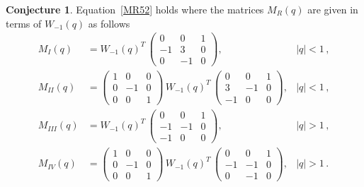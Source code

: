 \documentclass[12pt,reqno]{amsart}
\theoremstyle{definition}
\newtheorem{conjecture}[theorem]{Conjecture}
\begin{document}
\begin{conjecture}
  \label{conj.52M0}
  Equation~\eqref{MR52} holds where the matrices $M_R(q)$ are given in
  terms of $W_{-1}(q)$ as follows 
\begin{subequations}
\begin{align}
  \label{M52I}
  M_I(q)
  &= W_{-1}(q)^T \,
    \begin{pmatrix}
      0 & 0 & 1 \\
      -1 & 3 & 0 \\
      0 & -1 & 0
    \end{pmatrix}, & |q|<1 \,,  \\
  \label{M52II}
  M_{II}(q)
  &=\begin{pmatrix}
      1&0&0\\
      0&-1&0\\
      0&0&1
    \end{pmatrix} \,
           W_{-1}(q)^T \,
           \begin{pmatrix}
             0&0&1\\
             3&-1&0\\
             -1&0&0
           \end{pmatrix}, & |q|<1 \,, \\
  \label{M52III}
  M_{III}(q)
  &=
         W_{-1}(q)^T \,
         \begin{pmatrix}
           0&0&1\\
           -1&-1&0\\
           -1&0&0
         \end{pmatrix}, & |q| >1 \,, \\
  \label{M52IV}
  M_{IV}(q)
  &=\begin{pmatrix}
      1&0&0\\
      0&-1&0\\
      0&0&1
    \end{pmatrix} \,
    W_{-1}(q)^T \,
    \begin{pmatrix}
      0&0&1\\
      -1&-1&0\\
      0&-1&0
    \end{pmatrix}, & |q| >1 \,.
\end{align}
\end{subequations}
\end{conjecture}
\end{document}
